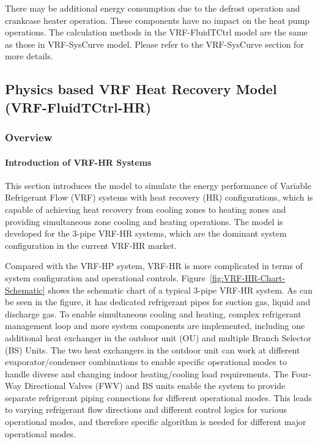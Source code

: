 There may be additional energy consumption due to the defrost operation and crankcase heater operation. These components have no impact on the heat pump operations. The calculation methods in the VRF-FluidTCtrl model are the same as those in VRF-SysCurve model. Please refer to the VRF-SysCurve section for more details.

\subsection{Physics based VRF Heat Recovery Model (VRF-FluidTCtrl-HR)}\label{VRF-FluidTCtrl-HR}

\subsubsection{Overview}\label{VRF-FluidTCtrl-HR-overview}

\paragraph{Introduction of VRF-HR Systems}\label{Introduction-of-VRF-HR-Systems}

This section introduces the model to simulate the energy performance of Variable Refrigerant Flow (VRF) systems with heat recovery (HR) configurations, which is capable of achieving heat recovery from cooling zones to heating zones and providing simultaneous zone cooling and heating operations. The model is developed for the 3-pipe VRF-HR systems, which are the dominant system configuration in the current VRF-HR market.

Compared with the VRF-HP system, VRF-HR is more complicated in terms of system configuration and operational controls. Figure~\ref{fig:VRF-HR-Chart-Schematic} shows the schematic chart of a typical 3-pipe VRF-HR system. As can be seen in the figure, it has dedicated refrigerant pipes for suction gas, liquid and discharge gas. To enable simultaneous cooling and heating, complex refrigerant management loop and more system components are implemented, including one additional heat exchanger in the outdoor unit (OU) and multiple Branch Selector (BS) Units. The two heat exchangers in the outdoor unit can work at different evaporator/condenser combinations to enable specific operational modes to handle diverse and changing indoor heating/cooling load requirements. The Four-Way Directional Valves (FWV) and BS units enable the system to provide separate refrigerant piping connections for different operational modes. This leads to varying refrigerant flow directions and different control logics for various operational modes, and therefore specific algorithm is needed for different major operational modes.

